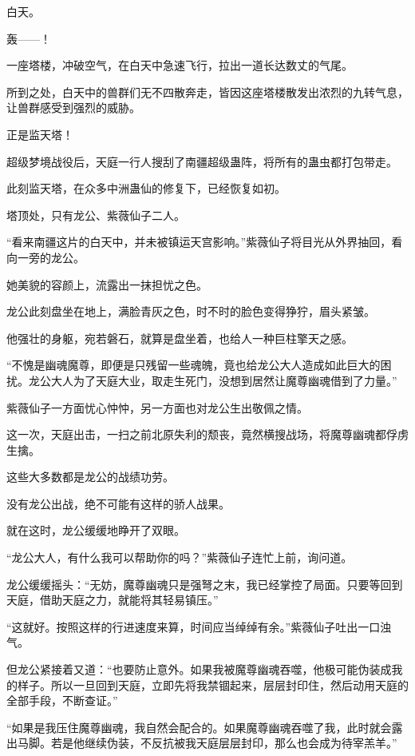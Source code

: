 
\begin{this_body}

白天。

轰——！

一座塔楼，冲破空气，在白天中急速飞行，拉出一道长达数丈的气尾。

所到之处，白天中的兽群们无不四散奔走，皆因这座塔楼散发出浓烈的九转气息，让兽群感受到强烈的威胁。

正是监天塔！

超级梦境战役后，天庭一行人搜刮了南疆超级蛊阵，将所有的蛊虫都打包带走。

此刻监天塔，在众多中洲蛊仙的修复下，已经恢复如初。

塔顶处，只有龙公、紫薇仙子二人。

“看来南疆这片的白天中，并未被镇运天宫影响。”紫薇仙子将目光从外界抽回，看向一旁的龙公。

她美貌的容颜上，流露出一抹担忧之色。

龙公此刻盘坐在地上，满脸青灰之色，时不时的脸色变得狰狞，眉头紧皱。

他强壮的身躯，宛若磐石，就算是盘坐着，也给人一种巨柱擎天之感。

“不愧是幽魂魔尊，即便是只残留一些魂魄，竟也给龙公大人造成如此巨大的困扰。龙公大人为了天庭大业，取走生死门，没想到居然让魔尊幽魂借到了力量。”

紫薇仙子一方面忧心忡忡，另一方面也对龙公生出敬佩之情。

这一次，天庭出击，一扫之前北原失利的颓丧，竟然横搜战场，将魔尊幽魂都俘虏生擒。

这些大多数都是龙公的战绩功劳。

没有龙公出战，绝不可能有这样的骄人战果。

就在这时，龙公缓缓地睁开了双眼。

“龙公大人，有什么我可以帮助你的吗？”紫薇仙子连忙上前，询问道。

龙公缓缓摇头：“无妨，魔尊幽魂只是强弩之末，我已经掌控了局面。只要等回到天庭，借助天庭之力，就能将其轻易镇压。”

“这就好。按照这样的行进速度来算，时间应当绰绰有余。”紫薇仙子吐出一口浊气。

但龙公紧接着又道：“也要防止意外。如果我被魔尊幽魂吞噬，他极可能伪装成我的样子。所以一旦回到天庭，立即先将我禁锢起来，层层封印住，然后动用天庭的全部手段，不断查证。”

“如果是我压住魔尊幽魂，我自然会配合的。如果魔尊幽魂吞噬了我，此时就会露出马脚。若是他继续伪装，不反抗被我天庭层层封印，那么也会成为待宰羔羊。”


\end{this_body}

